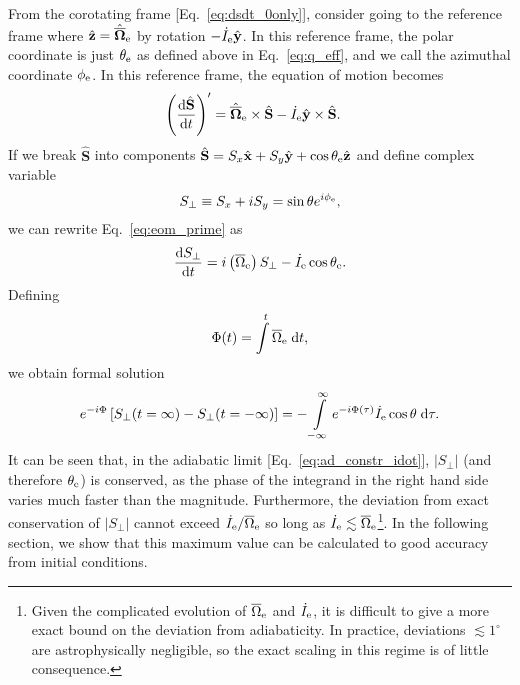 \documentclass[
        fleqn,
        usenatbib,
    ]{mnras}
\newcommand*{\rd}[2]{\frac{\mathrm{d}#1}{\mathrm{d}#2}}
\newcommand*{\abs}[1]{\left|#1\right|}
\newcommand*{\bm}[1]{\boldsymbol{\mathbf{#1}}}
\newcommand*{\uv}[1]{\hat{\bm{#1}}}
\newcommand*{\p}[1]{\left(#1\right)}
\newcommand*{\s}[1]{\left[#1\right]}
\begin{document}
From the corotating frame [Eq.~\eqref{eq:dsdt_0only}], consider going to the
reference frame where $\uv{z} = \uv{\overline{\Omega}}_{\rm e} $ by rotation
$-\dot{I}_{\rm e}\uv{y}$. In this reference frame, the polar coordinate is just
$\theta_{\rm e}$ as defined above in Eq.~\eqref{eq:q_eff}, and we call the
azimuthal coordinate $\phi_{\rm e}$. In this reference frame, the equation of
motion becomes
\begin{align}
    \p{\rd{\uv{S}}{t}}' &= \uv{\overline{\Omega}}_{\rm e} \times \uv{S}
        - \dot{I}_{\rm e} \uv{y} \times \uv{S}\label{eq:eom_prime}.
\end{align}
If we break $\uv{S}$ into components $\uv{S} = S_x\uv{x} + S_y \uv{y} + \cos
\theta_{\rm e} \uv{z}$ and define complex variable
\begin{equation}
    S_\perp \equiv S_x + iS_y = \sin\theta e^{i\phi_{\rm e}},
\end{equation}
we can rewrite Eq.~\ref{eq:eom_prime} as
\begin{equation}
    \rd{S_\perp}{t} = i\p{\overline{\Omega}_{\rm e}} S_\perp
        - \dot{I}_{\rm e} \cos \theta_{\rm e}.
\end{equation}
Defining
\begin{equation}
    \Phi(t) = \int\limits^t \overline{\Omega}_{\rm e}\;\mathrm{d}t,
\end{equation}
we obtain formal solution
\begin{equation}
    e^{-i\Phi}\s{S_{\perp}(t = \infty) - S_{\perp}(t = -\infty)}
        = -\int\limits_{-\infty}^\infty
            e^{-i\Phi(\tau)}\dot{I}_{\rm e} \cos \theta\;\mathrm{d}\tau.
            \label{eq:formal_sol_0}
\end{equation}
It can be seen that, in the adiabatic limit [Eq.~\eqref{eq:ad_constr_idot}],
$\abs{S_\perp}$ (and therefore $\theta_{\rm e}$) is conserved, as the phase of
the integrand in the right hand side varies much faster than the magnitude.
Furthermore, the deviation from exact conservation of $\abs{S_{\perp}}$ cannot
exceed $\dot{I}_{\rm e} / \overline{\Omega}_{\rm
e}$ so long as $\dot{I}_{\rm e} \lesssim \overline{\Omega}_{\rm
e}$\footnote{Given the complicated evolution of $\overline{\Omega}_{\rm e}$ and
$\dot{I}_{\rm e}$, it is difficult to give a more exact bound on the deviation
from adiabaticity. In practice, deviations $\lesssim 1^\circ$ are
astrophysically negligible, so the exact scaling in this regime is of little
consequence.}. In the following section, we show that this maximum value can be
calculated to good accuracy from initial conditions.
\end{document}
